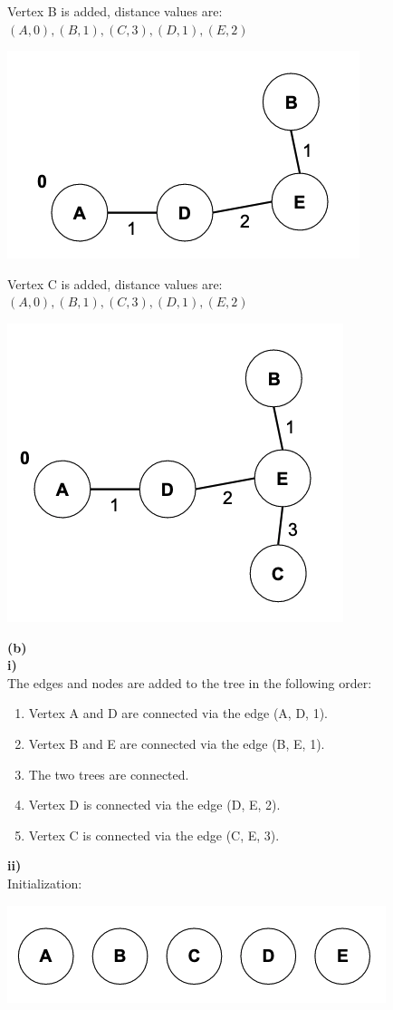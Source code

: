 \documentclass{article}
\begin{document}
Vertex B is added, distance values are: $(A, 0), (B,1), (C,3), (D,1), (E,2)$

\begin{center}
    \includegraphics[width=.4\textwidth]{1a-4.png}
\end{center}

Vertex C is added, distance values are: $(A, 0), (B,1), (C,3), (D,1), (E,2)$

\begin{center}
    \includegraphics[width=.4\textwidth]{1a-5.png}
\end{center}

{\bf (b)}\\
{\bf i)}\\
The edges and nodes are added to the tree in the following order:
\begin{enumerate}
    \item Vertex A and D are connected via the edge (A, D, 1).
    \item Vertex B and E are connected via the edge (B, E, 1).
    \item The two trees are connected.
    \item Vertex D is connected via the edge (D, E, 2).
    \item Vertex C is connected via the edge (C, E, 3).
\end{enumerate}

\bigskip

{\bf ii)}\\
Initialization:
\begin{center}
    \includegraphics[width=.45\textwidth]{1b-1.png}
\end{center}
\end{document}
